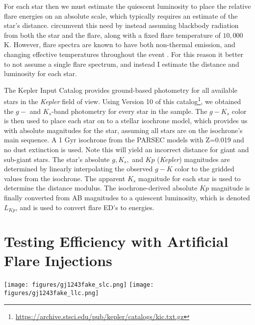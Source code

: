 \documentclass[twocolumn]{aastex6}
\newcommand{\Kepler}{\textsl{Kepler}\xspace}
\begin{document}
For each star then we must estimate the quiescent luminosity to place the relative flare energies on an absolute scale, which typically requires an estimate of the star's distance.
\citet{shibayama2013} circumvent this need by instead assuming blackbody radiation from both the star and the flare, along with a fixed flare temperature of $10,000$ K. However, flare spectra are known to have both non-thermal emission, and changing effective temperatures throughout the event \citep{kowalski2013}. For this reason it better to not assume a single flare spectrum, and instead I estimate the distance and luminosity for each star.

The Kepler Input Catalog provides ground-based photometry for all available stars in the \Kepler field of view. Using Version 10 of this catalog\footnote{\url{https://archive.stsci.edu/pub/kepler/catalogs/kic.txt.gz}}, we obtained the $g-$ and $K_s$-band photometry for every star in the sample. The $g-K_s$ color is then used to place each star on to a stellar isochrone model, which provides us with absolute magnitudes for the star, assuming all stars are on the isochrone's main sequence. A 1 Gyr isochrone from the PARSEC models \citep{bressan2012} with Z=0.019 and no dust extinction is used. Note this will yield an incorrect distance for giant and sub-giant stars. The star's absolute $g, K_s,$ and $Kp$ (\Kepler) magnitudes are determined by linearly interpolating the observed $g-K$ color to the gridded values from the isochrone. The apparent $K_s$ magnitude for each star is used to determine the distance modulus. The isochrone-derived absolute $Kp$ magnitude is finally converted from AB magnitudes to a quiescent luminosity, which is denoted $L_{Kp}$, and is used to convert flare ED's to energies.



\section{Testing Efficiency with Artificial Flare Injections}
\label{sec:fakeflares}



\begin{figure*}[!t]
\centering
\texttt{[image: figures/gj1243fake\_slc.png]}
\texttt{[image: figures/gj1243fake\_llc.png]}
\caption{
Results from recovery tests of artificial flares injected in to the \Kepler light curves for the M4 dwarf star GJ 1243 (KIC 9726699) using short cadence (left) and long cadence (right). The binned recovery fraction for 100 artificial flares is plotted (black line) along with a Weiner-filter smoothed version (red dashed line). Recovery fractions of 68\% and 90\% for the smoothed version are given for reference (heavy blue lines), and are saved for each artificial flare test. In the case of the long cadence data the recovery fraction did not reach 90\% for the test within this portion of data.
}
\label{fig:fake1}
\end{figure*}
\end{document}
